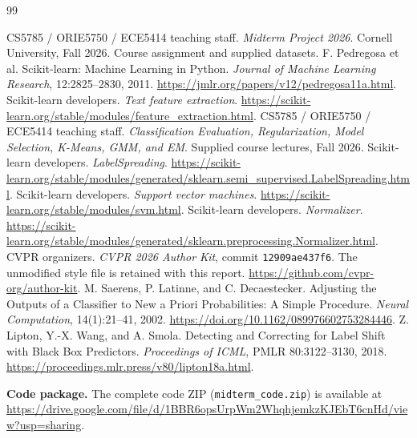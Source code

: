 {\small
\begin{thebibliography}{99}
\raggedright
{} CS5785 / ORIE5750 / ECE5414 teaching staff.
\emph{Midterm Project 2026}. Cornell University, Fall 2026. Course assignment and supplied datasets.
 F. Pedregosa et al. Scikit-learn: Machine Learning in Python.
\emph{Journal of Machine Learning Research}, 12:2825--2830, 2011.
\url{https://jmlr.org/papers/v12/pedregosa11a.html}.
 Scikit-learn developers. \emph{Text feature extraction}.
\url{https://scikit-learn.org/stable/modules/feature_extraction.html}.
 CS5785 / ORIE5750 / ECE5414 teaching staff.
\emph{Classification Evaluation, Regularization, Model Selection, K-Means, GMM, and EM}.
Supplied course lectures, Fall 2026.
 Scikit-learn developers. \emph{LabelSpreading}.
\url{https://scikit-learn.org/stable/modules/generated/sklearn.semi_supervised.LabelSpreading.html}.
 Scikit-learn developers. \emph{Support vector machines}.
\url{https://scikit-learn.org/stable/modules/svm.html}.
 Scikit-learn developers. \emph{Normalizer}.
\url{https://scikit-learn.org/stable/modules/generated/sklearn.preprocessing.Normalizer.html}.
 CVPR organizers. \emph{CVPR 2026 Author Kit}, commit
\texttt{12909ae437f6}.
The unmodified style file is retained with this report.
\url{https://github.com/cvpr-org/author-kit}.
 M. Saerens, P. Latinne, and C. Decaestecker.
Adjusting the Outputs of a Classifier to New a Priori Probabilities: A Simple Procedure.
\emph{Neural Computation}, 14(1):21--41, 2002.
\url{https://doi.org/10.1162/089976602753284446}.
 Z. Lipton, Y.-X. Wang, and A. Smola.
Detecting and Correcting for Label Shift with Black Box Predictors.
\emph{Proceedings of ICML}, PMLR 80:3122--3130, 2018.
\url{https://proceedings.mlr.press/v80/lipton18a.html}.
\end{thebibliography}

\medskip
\noindent\textbf{Code package.}
The complete code ZIP (\texttt{midterm\_code.zip}) is available at
\url{https://drive.google.com/file/d/1BBR6opsUrpWm2WhqhjemkzKJEbT6cnHd/view?usp=sharing}.
}
